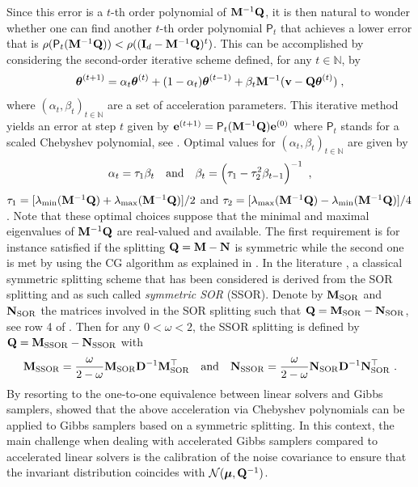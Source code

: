 \documentclass[nohypdvips,onefignum,onetabnum]{siamart171218}
\begin{document}
Since this error is a $t$-th order polynomial of $\mathbf{M}^{-1}\mathbf{Q}$, it is then natural to wonder whether one can find another $t$-th order polynomial $\mathsf{P}_t$ that achieves a lower error that is $\rho(\mathsf{P}_t(\mathbf{M}^{-1}\mathbf{Q})) < \rho((\mathbf{I}_d-\mathbf{M}^{-1}\mathbf{Q})^t)$.
This can be accomplished by considering the second-order iterative scheme defined, for any $t \in \mathbb{N}$, by \cite{axelsson_1994}
$$
\boldsymbol{\theta}^{(t+1)} = \alpha_t\boldsymbol{\theta}^{(t)} + (1-\alpha_t)\boldsymbol{\theta}^{(t-1)} + \beta_t \mathbf{M}^{-1}(\mathbf{v}-\mathbf{Q}\boldsymbol{\theta}^{(t)})\;,
$$
where $(\alpha_t,\beta_t)_{t \in \mathbb{N}}$ are a set of acceleration parameters.
This iterative method yields an error at step $t$ given by  $\mathbf{e}^{(t+1)}=\mathsf{P}_t(\mathbf{M}^{-1}\mathbf{Q})\mathbf{e}^{(0)}$ where $\mathsf{P}_t$ stands for a scaled Chebyshev polynomial, see .
Optimal values for $(\alpha_t,\beta_t)_{t \in \mathbb{N}}$ are given by \cite{axelsson_1994}
$$
\alpha_t = \tau_1\beta_t  \quad \text{and} \quad \beta_t = \left(\tau_1 - \tau_2^2\beta_{t-1}\right)^{-1} \ , 
$$
$\tau_1 = [\lambda_{\mathrm{min}}(\mathbf{M}^{-1}\mathbf{Q}) + \lambda_{\mathrm{max}}(\mathbf{M}^{-1}\mathbf{Q})]/2$ and $\tau_2 = [\lambda_{\mathrm{max}}(\mathbf{M}^{-1}\mathbf{Q}) - \lambda_{\mathrm{min}}(\mathbf{M}^{-1}\mathbf{Q})]/4$.
Note that these optimal choices suppose that the minimal and maximal eigenvalues of $\mathbf{M}^{-1}\mathbf{Q}$ are real-valued and available.
The first requirement is for instance satisfied if the splitting $\mathbf{Q}=\mathbf{M}-\mathbf{N}$ is symmetric while the second one is met by using the CG algorithm as explained in \cite{Fox2017}.
In the literature \cite{RobertsSahu1997,Fox2017}, a classical symmetric splitting scheme that has been considered is derived from the SOR splitting and as such called \textit{symmetric SOR} (SSOR).
Denote by $\mathbf{M}_{\mathrm{SOR}}$ and $\mathbf{N}_{\mathrm{SOR}}$ the matrices involved in the SOR splitting such that $\mathbf{Q} = \mathbf{M}_{\mathrm{SOR}} - \mathbf{N}_{\mathrm{SOR}}$, see row 4 of .
Then for any $0<\omega<2$, the SSOR splitting is defined by $\mathbf{Q} = \mathbf{M}_{\mathrm{SSOR}} - \mathbf{N}_{\mathrm{SSOR}}$ with 
$$
\mathbf{M}_{\mathrm{SSOR}} = \frac{\omega}{2-\omega}\mathbf{M}_{\mathrm{SOR}}\mathbf{D}^{-1}\mathbf{M}_{\mathrm{SOR}}^{\top} \quad \text{and} \quad \mathbf{N}_{\mathrm{SSOR}} = \frac{\omega}{2-\omega}\mathbf{N}_{\mathrm{SOR}}\mathbf{D}^{-1}\mathbf{N}_{\mathrm{SOR}}^{\top} \ .
$$
By resorting to the one-to-one equivalence between linear solvers and Gibbs samplers, \cite{FoxParker14,Fox2017} showed that the above acceleration via Chebyshev polynomials can be applied to Gibbs samplers based on a symmetric splitting.
In this context, the main challenge when dealing with accelerated Gibbs samplers compared to accelerated linear solvers is the calibration of the noise covariance to ensure that the invariant distribution coincides with $\mathcal{N}(\boldsymbol{\mu},\mathbf{Q}^{-1})$.
\end{document}
